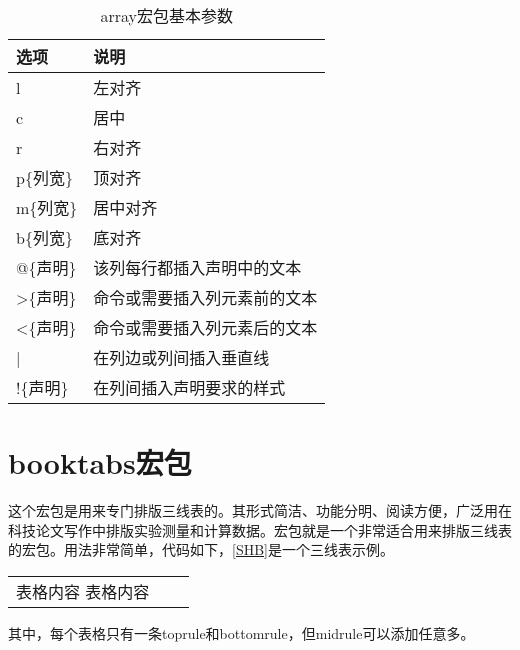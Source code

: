 \begin{table}[!htb]
    \centering
    \caption{array宏包基本参数}
    \begin{tabular}{ll}
    \toprule
    选项 & 说明 \\
    \midrule
    l & 左对齐 \\
    c & 居中 \\
    r & 右对齐 \\
    p\{列宽\} & 顶对齐 \\
    m\{列宽\} & 居中对齐 \\
    b\{列宽\} & 底对齐 \\
    @\{声明\} & 该列每行都插入声明中的文本 \\
    >\{声明\} & 命令或需要插入列元素前的文本 \\
    <\{声明\} & 命令或需要插入列元素后的文本 \\
    | & 在列边或列间插入垂直线 \\
    !\{声明\} & 在列间插入声明要求的样式 \\
    \bottomrule
    \end{tabular}
\end{table}

\section{booktabs宏包}

这个宏包是用来专门排版三线表的。其形式简洁、功能分明、阅读方便，广泛用在科技论文写作中排版实验测量和计算数据。宏包就是一个非常适合用来排版三线表的宏包。用法非常简单，代码如下，\autoref{SHB}是一个三线表示例。

\begin{latex}
\begin{tabular}{lll}
    \toprule[2pt]
    表格内容
    \midrule[0.5pt]
    表格内容
    \bottomrule[0.5pt]
\end{tabular}
\end{latex}

其中，每个表格只有一条toprule和bottomrule，但midrule可以添加任意多。


